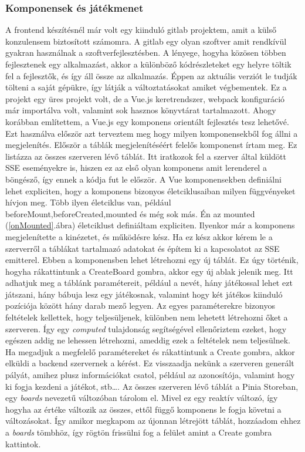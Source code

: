 \documentclass[a4paper,twoside]{article}
\begin{document}
\subsubsection{Komponensek és játékmenet}
A frontend készítésnél már volt egy kiinduló gitlab projektem, amit a külső konzulensem
biztosított számomra. A gitlab egy olyan szoftver amit rendkívül gyakran használnak a szoftverfejlesztésben. A lényege, hogyha közösen többen fejlesztenek egy alkalmazást, akkor a különböző kódrészleteket egy helyre töltik fel a fejlesztők, és így áll össze az alkalmazás. Éppen az aktuális verziót le tudják tölteni a saját gépükre, így látják a változtatásokat amiket végbementek. Ez a projekt egy üres projekt volt, de a Vue.js keretrendszer, webpack
konfiguráció már importálva volt, valamint sok hasznos könyvtárat tartalmazott. Ahogy
korábban említettem, a Vue.js egy komponens orientált fejlesztés tesz lehetővé. Ezt használva
először azt terveztem meg hogy milyen komponensekből fog állni a megjelenítés.
Először a táblák megjelenítéséért felelős komponenst írtam meg. Ez listázza az összes
szerveren lévő táblát. Itt iratkozok fel a szerver által küldött SSE eseményekre is, hiszen ez az első olyan komponens amit lerenderel a böngésző, így ennek a kódja fut le először. A Vue komponensekben definiálni lehet expliciten, hogy a komponens bizonyos életciklusaiban milyen függvényeket hívjon meg. Több ilyen életciklus van, például beforeMount,beforeCreated,mounted és még sok más. Én az mounted (\ref{onMounted}.ábra) életciklust definiáltam expliciten. Ilyenkor már a komponens megjelenítette a kinézetet, és működésre kész. Ha ez kész akkor kérem le a szerverről a táblákat tartalmazó adatokat és építem ki a kapcsolatot az SSE emitterel. Ebben a komponensben lehet létrehozni egy új táblát. Ez úgy történik, hogyha rákattintunk a CreateBoard gombra, akkor egy új ablak jelenik meg. Itt adhatjuk meg a táblánk paramétereit, például a nevét, hány játékossal lehet ezt játszani, hány bábuja lesz egy játékosnak, valamint hogy két játékos kiinduló pozíciója között hány darab mező legyen. Az egyes paraméterekre bizonyos feltételek kellettek, hogy teljesüljenek, különben nem lehetett létrehozni őket a szerveren. Így egy \textit{computed} tulajdonság segítségével ellenőriztem ezeket, hogy egészen addig ne lehessen létrehozni, ameddig ezek a feltételek nem teljesülnek. Ha megadjuk a megfelelő paramétereket és rákattintunk a Create gombra, akkor elküldi a backend szervernek a kérést. Ez visszaadja nekünk a szerveren generált pályát, amihez plusz információkat csatol, például az azonosítója, valamint hogy ki fogja kezdeni a játékot, stb\dots. Az összes szerveren lévő táblát a Pinia Storeban, egy \textit{boards} nevezetű változóban tárolom el. Mivel ez egy reaktív változó, így hogyha az értéke változik az összes, ettől függő komponens le fogja követni a változásokat. Így amikor megkapom az újonnan létrejött táblát, hozzáadom ehhez a \textit{boards} tömbhöz, így rögtön frissülni fog a felület amint a Create gombra kattintok. 
\end{document}
